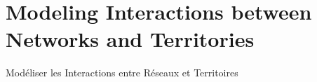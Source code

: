 

\chapter{Modeling Interactions between Networks and Territories}{Modéliser les Interactions entre Réseaux et Territoires} %

\label{ch:modelinginteractions} %














